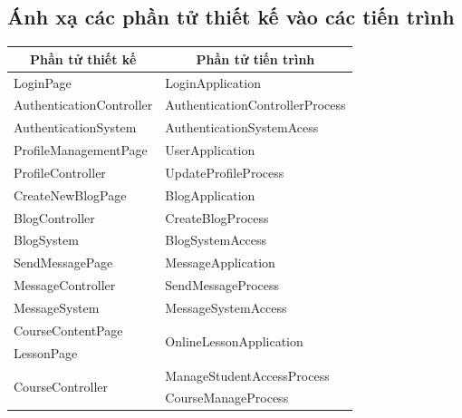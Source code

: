 \documentclass[./../main.tex]{subfiles}
\begin{document}
\subsection{Ánh xạ các phần tử thiết kế vào các tiến trình}
\begin{longtable}{|p{}|p{}|}
	\hline
	\multicolumn{1}{|c|}{\textbf{Phần tử thiết kế}} & \multicolumn{1}{c|}{\textbf{Phần tử tiến trình}} \\ \hline
	\endfirsthead
	\endhead
	LoginPage                                       & LoginApplication                                 \\ \hline
	AuthenticationController                        & AuthenticationControllerProcess                  \\ \hline
	AuthenticationSystem                            & AuthenticationSystemAcess                        \\ \hline
	ProfileManagementPage                           & UserApplication                                  \\ \hline
	ProfileController                               & UpdateProfileProcess                             \\ \hline
	CreateNewBlogPage                               & BlogApplication                                  \\ \hline
	BlogController                                  & CreateBlogProcess                                \\ \hline
	BlogSystem                                      & BlogSystemAccess                                 \\ \hline
	SendMessagePage                                 & MessageApplication                               \\ \hline
	MessageController                               & SendMessageProcess                               \\ \hline
	MessageSystem                                   & MessageSystemAccess                              \\ \hline
	CourseContentPage                               & \multirow{2}{*}{OnlineLessonApplication}         \\
	LessonPage                                      &                                                  \\ \hline
	\multirow{3}{*}{CourseController}               & ManageStudentAccessProcess                       \\
	                                                & CourseManageProcess                              \\

\end{longtable}
\end{document}
